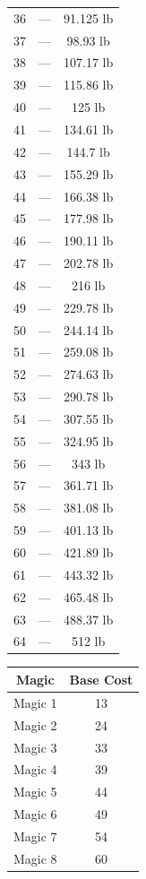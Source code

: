 \begin{multicols}{3}
\begin{center}
{\begin{tabular}{|c|c|c|}
			36 & — & 91.125 lb \\
			37 & — & 98.93 lb \\
			38 & — & 107.17 lb \\
			39 & — & 115.86 lb \\
			40 & — & 125 lb \\
			41 & — & 134.61 lb \\
			42 & — & 144.7 lb \\
			43 & — & 155.29 lb \\
			44 & — & 166.38 lb \\
			45 & — & 177.98 lb \\
			46 & — & 190.11 lb \\
			47 & — & 202.78 lb \\
			48 & — & 216 lb \\
			49 & — & 229.78 lb \\
			50 & — & 244.14 lb \\
			51 & — & 259.08 lb \\
			52 & — & 274.63 lb \\
			53 & — & 290.78 lb \\
			54 & — & 307.55 lb \\
			55 & — & 324.95 lb \\
			56 & — & 343 lb \\
			57 & — & 361.71 lb \\
			58 & — & 381.08 lb \\
			59 & — & 401.13 lb \\
			60 & — & 421.89 lb \\
			61 & — & 443.32 lb \\
			62 & — & 465.48 lb \\
			63 & — & 488.37 lb \\
			64 & — & 512 lb \\
			\hline
		\end{tabular}
		}
	\end{center}
	
	\begin{center}
		\begin{tabular}{|c|c|}
			\hline
			Magic & Base Cost \\
			\hline
			\hline
			Magic 1 & 13 \\
			Magic 2 & 24 \\
			Magic 3 & 33 \\
			Magic 4 & 39 \\
			Magic 5 & 44 \\
			Magic 6 & 49 \\
			Magic 7 & 54 \\
			Magic 8 & 60 \\
			\hline
		\end{tabular}
	\end{center}
	

\end{multicols}
